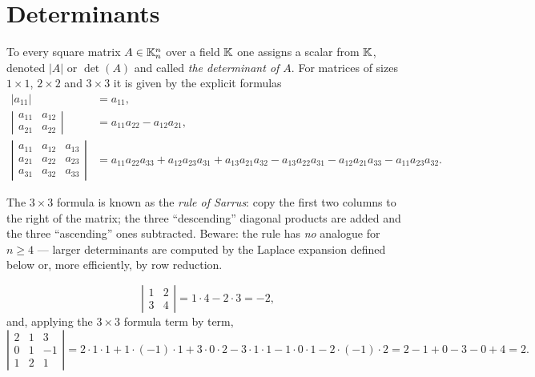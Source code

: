 \section{Determinants}

To every square matrix $A \in \mathbb{K}^n_n$ over a field $\mathbb{K}$ one assigns a scalar from $\mathbb{K}$, denoted $|A|$ or
$\det(A)$ and called \emph{the determinant of $A$}. For matrices of sizes $1\times 1$, $2\times 2$ and
$3\times 3$ it is given by the explicit formulas
\[
\begin{aligned}
| a_{11} | &= a_{11},\\[2pt]
\left | \begin{array}{cc} a_{11} & a_{12}\\ a_{21} & a_{22} \end{array} \right | &= a_{11} a_{22} - a_{12} a_{21},\\[2pt]
\left | \begin{array}{ccc}
a_{11} & a_{12} & a_{13}\\ a_{21} & a_{22} & a_{23}\\ a_{31} & a_{32} & a_{33}
\end{array} \right | &=
a_{11} a_{22} a_{33} + a_{12} a_{23} a_{31}+a_{13} a_{21} a_{32}
- a_{13}a_{22}a_{31} -a_{12} a_{21} a_{33} - a_{11} a_{23} a_{32}.
\end{aligned}
\]

\begin{remark}
The $3\times 3$ formula is known as the \emph{rule of Sarrus}: copy the first two columns to the right of
the matrix; the three ``descending'' diagonal products are added and the three ``ascending'' ones
subtracted. Beware: the rule has \emph{no} analogue for $n\geq 4$ — larger determinants are computed by
the Laplace expansion defined below or, more efficiently, by row reduction.
\end{remark}

\begin{example}
\[
\left| \begin{array}{cc} 1 & 2\\ 3 & 4 \end{array} \right| = 1\cdot 4 - 2\cdot 3 = -2,
\]
and, applying the $3\times 3$ formula term by term,
\[
\left| \begin{array}{ccc} 2 & 1 & 3\\ 0 & 1 & -1\\ 1 & 2 & 1 \end{array} \right|
= 2\cdot 1\cdot 1 + 1\cdot(-1)\cdot 1 + 3\cdot 0\cdot 2
- 3\cdot 1\cdot 1 - 1\cdot 0\cdot 1 - 2\cdot(-1)\cdot 2
= 2 - 1 + 0 - 3 - 0 + 4 = 2.
\]
\end{example}


